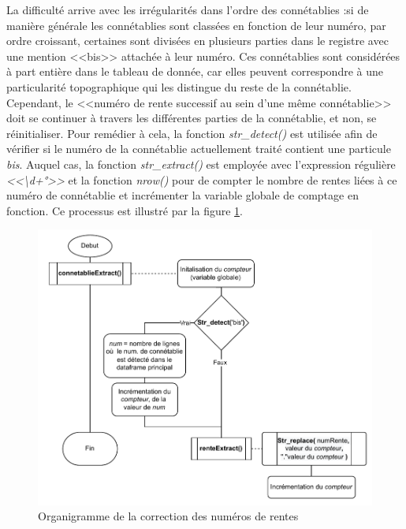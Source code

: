 La difficulté arrive avec les irrégularités dans l'ordre des connétablies :si de manière générale les connétablies sont classées en fonction de leur numéro, par ordre croissant, certaines  sont divisées en plusieurs parties dans le registre avec une mention <<bis>>  attachée  à leur numéro.  Ces connétablies sont considérées à part entière dans le tableau de donnée, car elles peuvent correspondre à une particularité topographique qui les distingue du reste de la connétablie. Cependant, le <<numéro de rente successif au sein d'une même connétablie>> doit se continuer à travers les différentes parties de la connétablie,  et non, se réinitialiser. Pour remédier à cela, 
la fonction \textit{str\_detect()} est utilisée  afin de vérifier si le numéro de la connétablie actuellement traité contient une particule \textit{bis}. Auquel cas, la fonction \textit{str\_extract()} est employée avec l'expression régulière \textit{<<\textbackslash d+°>>} et la fonction \textit{nrow()} pour de compter le nombre de rentes liées à ce numéro de connétablie et incrémenter la variable globale de comptage en  fonction. Ce processus est illustré par la figure \ref{schemaNumRenteCorr}.
\begin{figure}
    \centering
    \includegraphics{3.Results/Img/numRente_corr.drawio.pdf}
    \caption{Organigramme de la correction des numéros de rentes}
    \label{schemaNumRenteCorr}
\end{figure}



